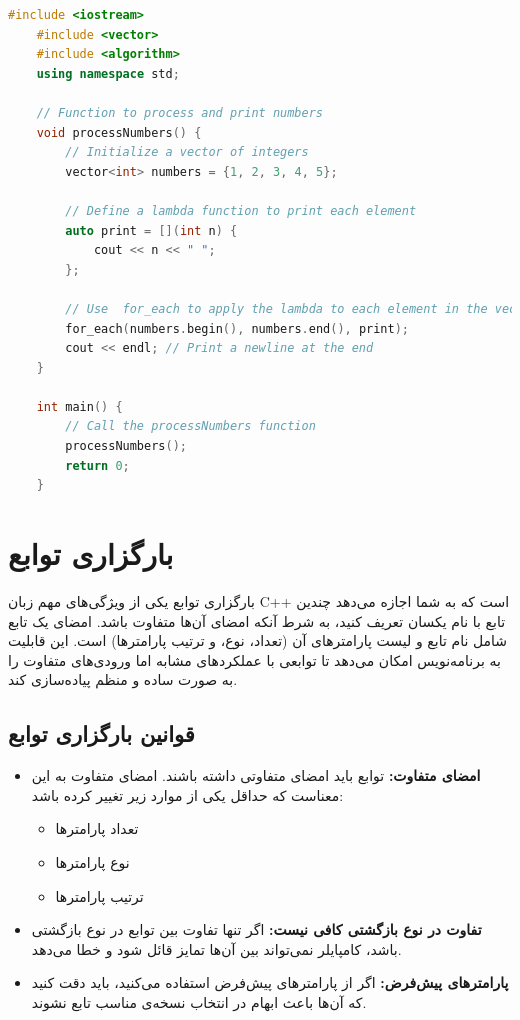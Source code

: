 \documentclass[12pt, a4paper]{report}
\begin{document}
\begin{LTR}
\begin{lstlisting}[language=C++, breaklines=true]
	#include <iostream>
	#include <vector>
	#include <algorithm>
	using namespace std;
	
	// Function to process and print numbers
	void processNumbers() {
		// Initialize a vector of integers
		vector<int> numbers = {1, 2, 3, 4, 5};
		
		// Define a lambda function to print each element
		auto print = [](int n) {
			cout << n << " ";
		};
		
		// Use  for_each to apply the lambda to each element in the vector
		for_each(numbers.begin(), numbers.end(), print);
		cout << endl; // Print a newline at the end
	}
	
	int main() {
		// Call the processNumbers function
		processNumbers();
		return 0;
	}
\end{lstlisting}
\end{LTR}


\section{بارگزاری توابع}

بارگزاری توابع یکی از ویژگی‌های مهم زبان C++ است که به شما اجازه می‌دهد چندین تابع با نام یکسان تعریف کنید، به شرط آنکه امضای  آن‌ها متفاوت باشد. امضای یک تابع شامل نام تابع و لیست پارامترهای آن (تعداد، نوع، و ترتیب پارامترها) است. این قابلیت به برنامه‌نویس امکان می‌دهد تا توابعی با عملکردهای مشابه اما ورودی‌های متفاوت را به صورت ساده و منظم پیاده‌سازی کند.

\subsection{قوانین بارگزاری توابع}
\begin{itemize}
\item \textbf{امضای متفاوت:} توابع باید امضای متفاوتی داشته باشند. امضای متفاوت به این معناست که حداقل یکی از موارد زیر تغییر کرده باشد:
\begin{itemize}
	\item تعداد پارامترها
	\item نوع پارامترها
	\item ترتیب پارامترها
\end{itemize}
\item \textbf{تفاوت در نوع بازگشتی کافی نیست:} اگر تنها تفاوت بین توابع در نوع بازگشتی باشد، کامپایلر نمی‌تواند بین آن‌ها تمایز قائل شود و خطا می‌دهد.
\item \textbf{پارامترهای پیش‌فرض:} اگر از پارامترهای پیش‌فرض استفاده می‌کنید، باید دقت کنید که آن‌ها باعث ابهام در انتخاب نسخه‌ی مناسب تابع نشوند.
\end{itemize}
\end{document}

